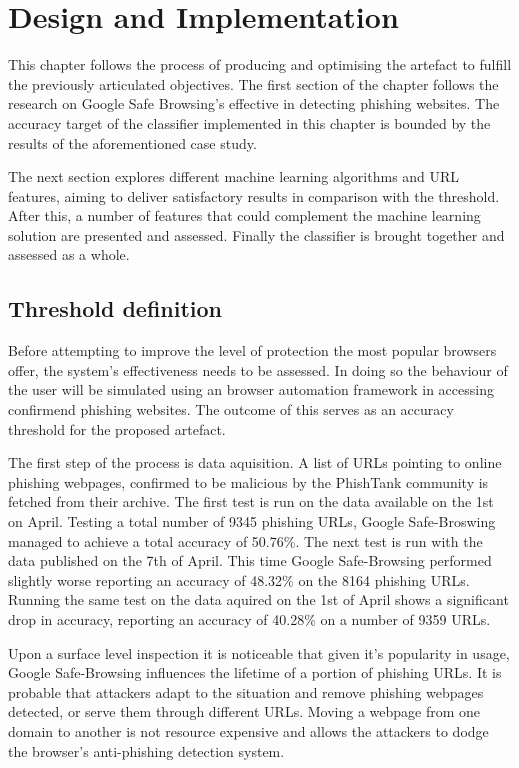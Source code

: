 
\chapter{Design and Implementation}
This chapter follows the process of producing and optimising the artefact to fulfill the previously articulated objectives. The first section of the chapter follows the research on Google Safe Browsing's effective in detecting phishing websites. The accuracy target of the classifier implemented in this chapter is bounded by the results of the aforementioned case study.

The next section explores different machine learning algorithms and URL features, aiming to deliver satisfactory results in comparison with the threshold. After this, a number of features that could complement the machine learning solution are presented and assessed. Finally the classifier is brought together and assessed as a whole.

\section{Threshold definition}
Before attempting to improve the level of protection the most popular browsers offer, the system's effectiveness needs to be assessed. In doing so the behaviour of the user will be simulated using an browser automation framework in accessing confirmend phishing websites. The outcome of this serves as an accuracy threshold for the proposed artefact.

The first step of the process is data aquisition. A list of URLs pointing to online phishing webpages, confirmed to be malicious by the PhishTank community is fetched from their archive. The first test is run on the data available on the 1st on April. Testing a total number of 9345 phishing URLs, Google Safe-Broswing managed to achieve a total accuracy of 50.76\%.
The next test is run with the data published on the 7th of April. This time Google Safe-Browsing performed slightly worse reporting an accuracy of 48.32\% on the 8164 phishing URLs. Running the same test on the data aquired on the 1st of April shows a significant drop in accuracy, reporting an accuracy of 40.28\% on a number of 9359 URLs.

Upon a surface level inspection it is noticeable that given it's popularity in usage, Google Safe-Browsing influences the lifetime of a portion of phishing URLs. It is probable that attackers adapt to the situation and remove phishing webpages detected, or serve them through different URLs. Moving a webpage from one domain to another is not resource expensive and allows the attackers to dodge the browser's anti-phishing detection system.

